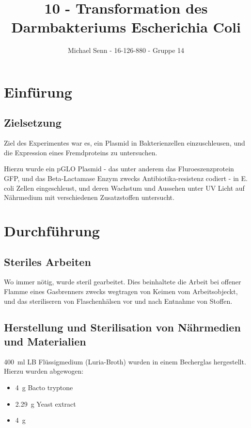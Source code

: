 \documentclass[a4paper,english]{scrreprt}
\title{10 - Transformation des Darmbakteriums Escherichia Coli}
\author{Michael Senn \maillink{michael.senn@students.unibe.ch} - 16-126-880 - Gruppe 14}
\date{\printdate}
\begin{document}
\maketitle

\chapter{Einfürung}

\section{Zielsetzung}

Ziel des Experimentes war es, ein Plasmid in Bakterienzellen einzuschleusen,
und die Expression eines Fremdproteins zu untersuchen.

Hierzu wurde ein pGLO Plasmid - das unter anderem das Fluroeszenzprotein GFP,
und das Beta-Lactamase Enzym zwecks Antibiotika-resistenz codiert - in E. coli
Zellen eingeschleust, und deren Wachstum und Aussehen unter UV Licht auf
Nährmedium mit verschiedenen Zusatzstoffen untersucht.

\chapter{Durchführung\cite{skriptv10}}

\section{Steriles Arbeiten}

Wo immer nötig, wurde steril gearbeitet. Dies beinhaltete die Arbeit bei
offener Flamme eines Gasbrenners zwecks wegtragen von Keimen vom
Arbeitsobjeckt, und das steriliseren von Flaschenhälsen vor und nach Entnahme
von Stoffen.

\section{Herstellung und Sterilisation von Nährmedien und Materialien}

\SI{400}{\ml} LB Flüssigmedium (Luria-Broth) wurden in einem Becherglas
hergestellt. Hierzu wurden abgewogen:

\begin{itemize}
	\item \SI{4}{\g} Bacto tryptone
	\item \SI{2.29}{\g} Yeast extract
	\item \SI{4}{\g} 
\end{itemize}
\end{document}
